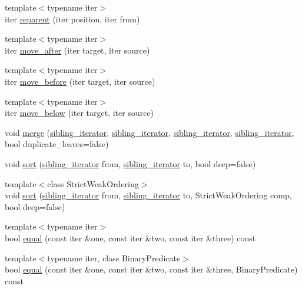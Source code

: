 \begin{CompactItemize}
\item 
{\footnotesize template$<$typename iter$>$ }\\iter \hyperlink{classtree_021a394ff7139df8573e2cb80e6beaa2}{reparent} (iter position, iter from)
\item 
{\footnotesize template$<$typename iter$>$ }\\iter \hyperlink{classtree_e7f72ba46cd061f71720c731b4a9bf63}{move\_\-after} (iter target, iter source)
\item 
{\footnotesize template$<$typename iter$>$ }\\iter \hyperlink{classtree_b45aa15042445a81b13873d3ef4a2e86}{move\_\-before} (iter target, iter source)
\item 
{\footnotesize template$<$typename iter$>$ }\\iter \hyperlink{classtree_d9502fe76187e35ef0dcd0a46a39193b}{move\_\-below} (iter target, iter source)
\item 
void \hyperlink{classtree_1e3cd901f8f8d8a3da0e1d32e9282db1}{merge} (\hyperlink{classtree_1_1sibling__iterator}{sibling\_\-iterator}, \hyperlink{classtree_1_1sibling__iterator}{sibling\_\-iterator}, \hyperlink{classtree_1_1sibling__iterator}{sibling\_\-iterator}, \hyperlink{classtree_1_1sibling__iterator}{sibling\_\-iterator}, bool duplicate\_\-leaves=false)
\item 
void \hyperlink{classtree_498ec42a5eb44cba8bf9ef6e7fd5db9e}{sort} (\hyperlink{classtree_1_1sibling__iterator}{sibling\_\-iterator} from, \hyperlink{classtree_1_1sibling__iterator}{sibling\_\-iterator} to, bool deep=false)
\item 
{\footnotesize template$<$class StrictWeakOrdering$>$ }\\void \hyperlink{classtree_f187f42c28a39304649ee41d3464f2ef}{sort} (\hyperlink{classtree_1_1sibling__iterator}{sibling\_\-iterator} from, \hyperlink{classtree_1_1sibling__iterator}{sibling\_\-iterator} to, StrictWeakOrdering comp, bool deep=false)
\item 
{\footnotesize template$<$typename iter$>$ }\\bool \hyperlink{classtree_59488f63fc6ad997809d971c48ecfc04}{equal} (const iter \&one, const iter \&two, const iter \&three) const 
\item 
{\footnotesize template$<$typename iter, class BinaryPredicate$>$ }\\bool \hyperlink{classtree_7ce7ff12a68be494b28925b2f7184a29}{equal} (const iter \&one, const iter \&two, const iter \&three, BinaryPredicate) const 
\item 

\end{CompactItemize}
